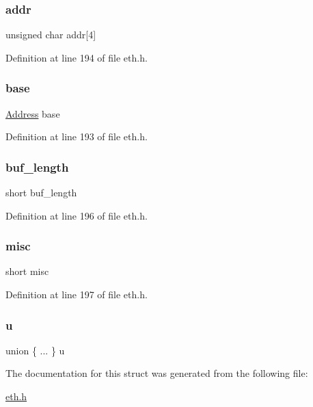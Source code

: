 \subsubsection{\texorpdfstring{addr}{addr}}
{\footnotesize\ttfamily unsigned char addr\mbox{[}4\mbox{]}}



Definition at line 194 of file eth.\+h.

\hypertarget{structeth__tx__head_ac2b0a066dca09bf3826dfaea2d1c5d02}{}\label{structeth__tx__head_ac2b0a066dca09bf3826dfaea2d1c5d02} 
\subsubsection{\texorpdfstring{base}{base}}
{\footnotesize\ttfamily \hyperlink{tap_8h_a40606a38de2ce007717541a358bab07b}{Address} base}



Definition at line 193 of file eth.\+h.

\hypertarget{structeth__tx__head_a92d29d8c4362c4b8a391fb5de16bcfd5}{}\label{structeth__tx__head_a92d29d8c4362c4b8a391fb5de16bcfd5} 
\subsubsection{\texorpdfstring{buf\+\_\+length}{buf\_length}}
{\footnotesize\ttfamily short buf\+\_\+length}



Definition at line 196 of file eth.\+h.

\hypertarget{structeth__tx__head_a9e51fa9fe6fdfe9b721010432087f889}{}\label{structeth__tx__head_a9e51fa9fe6fdfe9b721010432087f889} 
\subsubsection{\texorpdfstring{misc}{misc}}
{\footnotesize\ttfamily short misc}



Definition at line 197 of file eth.\+h.

\hypertarget{structeth__tx__head_a1544798358cd2c759d7a720acbe1e54d}{}\label{structeth__tx__head_a1544798358cd2c759d7a720acbe1e54d} 
\subsubsection{\texorpdfstring{u}{u}}
{\footnotesize\ttfamily union \{ ... \}   u}



The documentation for this struct was generated from the following file\+:\begin{DoxyCompactItemize}
\item 
\hyperlink{eth_8h}{eth.\+h}\end{DoxyCompactItemize}
